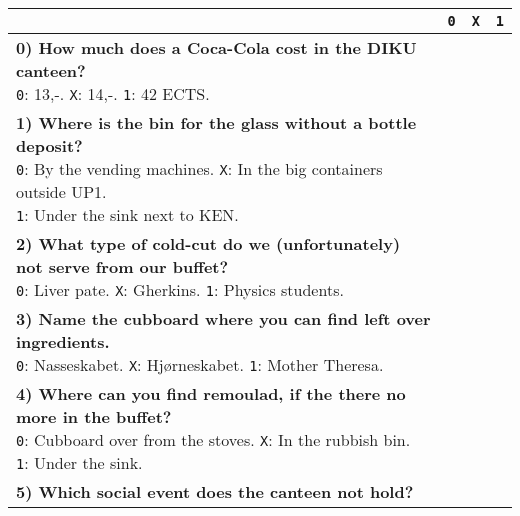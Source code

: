 \begin{center}
\begin{tabular}{|p{12cm}|p{0.2cm}|p{0.2cm}|p{0.2cm}|}
\hline
\vspace{0.2cm}
& \texttt{0} & \texttt{X} & \texttt{1} \\\hline
\parbox{12cm}{
  \vspace{0.2cm}
  \textbf{0) How much does a Coca-Cola cost in the DIKU canteen?} \\
  \texttt{0}: 13,-. \quad
  \texttt{X}: 14,-. \quad
  \texttt{1}: 42 ECTS.
  \vspace{0.1cm}
} & & & \\\hline
\parbox{12cm}{
  \vspace{0.2cm}
  \textbf{1) Where is the bin for the glass without a bottle deposit?} \\
  \texttt{0}: By the vending machines. \quad
  \texttt{X}: In the big containers outside UP1. \\
  \texttt{1}: Under the sink next to KEN.
  \vspace{0.1cm}
} & & & \\\hline
\parbox{12cm}{
  \vspace{0.2cm}
  \textbf{2) What type of cold-cut do we (unfortunately) not serve from our
  buffet?} \\
  \texttt{0}: Liver pate. \quad
  \texttt{X}: Gherkins. \quad
  \texttt{1}: Physics students.
  \vspace{0.1cm}
} & & & \\\hline
\parbox{12cm}{
  \vspace{0.2cm}
  \textbf{3) Name the cubboard where you can find left over
  ingredients.} \\
  \texttt{0}: Nasseskabet. \quad
  \texttt{X}: Hjørneskabet. \quad
  \texttt{1}: Mother Theresa.
  \vspace{0.1cm}
} & & & \\\hline
\parbox{12cm}{
  \vspace{0.2cm}
  \textbf{4) Where can you find remoulad, if the there no more in the
  buffet?} \\
  \texttt{0}: Cubboard over from the stoves. \quad
  \texttt{X}: In the rubbish bin. \\
  \texttt{1}: Under the sink.
  \vspace{0.1cm}
} & & & \\\hline
\parbox{12cm}{
  \vspace{0.2cm}
  \textbf{5) Which social event does the canteen not hold?} \\
}
\end{tabular}
\end{center}
